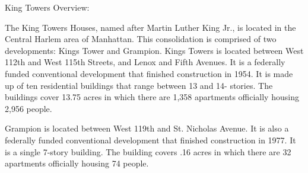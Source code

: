 King Towers Overview: 

The King Towers Houses, named after Martin Luther King Jr., is located in the Central Harlem area of Manhattan. This consolidation is comprised of two developments: Kings Tower and Grampion. Kings Towers is located between West 112th and West 115th Streets, and Lenox and Fifth Avenues. It is a federally funded conventional development that finished construction in 1954. It is made up of ten residential buildings that range between 13 and 14- stories. The buildings cover 13.75 acres in which there are 1,358 apartments officially housing 2,956 people.  

 

Grampion is located between West 119th and St. Nicholas Avenue. It is also a federally funded conventional development that finished construction in 1977. It is a single 7-story building. The building covers .16 acres in which there are 32 apartments officially housing 74 people.
